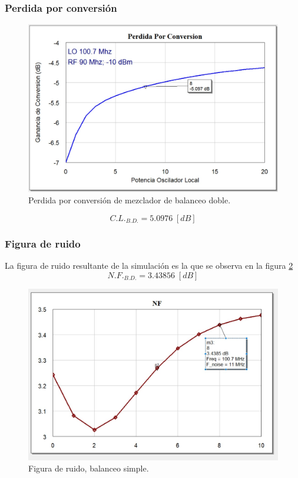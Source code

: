 \documentclass[twocolumn]{article}
\begin{document}
\subsubsection{Perdida por conversión}
%
\begin{figure}[h]
  \centering    
	\includegraphics[scale=0.3]{imagenes/CL3.jpg}
	\caption{Perdida por conversión de mezclador de balanceo doble.}\label{fig:CL3}
\end{figure}
\[C.L._{B.D.} = 5.097 6 \; [dB] \]
%
\subsubsection{Figura de ruido}
%
La figura de ruido resultante de la simulación es la que se observa en la figura \textcolor{blue}{\ref{fig:FN3}}
\[N.F._{B.D.} = 3.43856 \; [dB] \]
\begin{figure}[H]
  \centering    
	\includegraphics[width=\columnwidth]{imagenes/FN3}
	\caption{Figura de ruido, balanceo simple.}\label{fig:FN3}
\end{figure}
\vfill
\end{document}
